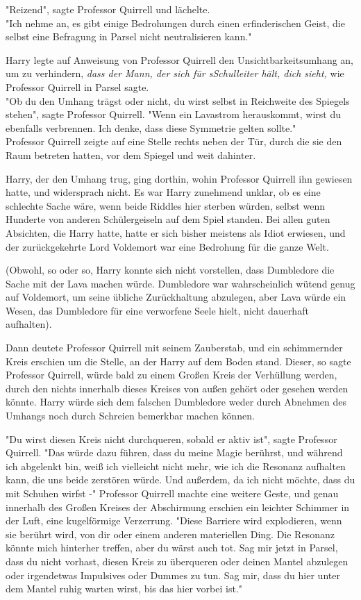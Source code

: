 {"Reizend", sagte Professor Quirrell und lächelte.\\ "Ich nehme an, es gibt einige Bedrohungen durch einen erfinderischen Geist, die selbst eine Befragung in Parsel nicht neutralisieren kann."

Harry legte auf Anweisung von Professor Quirrell den Unsichtbarkeitsumhang an, um zu verhindern, \emph{dass der Mann, der sich für sSchulleiter hält, dich sieht,} wie Professor Quirrell in Parsel sagte.\\ "Ob du den Umhang trägst oder nicht, du wirst selbst in Reichweite des Spiegels stehen", sagte Professor Quirrell. "Wenn ein Lavastrom herauskommt, wirst du ebenfalls verbrennen. Ich denke, dass diese Symmetrie gelten sollte."\\ Professor Quirrell zeigte auf eine Stelle rechts neben der Tür, durch die sie den Raum betreten hatten, vor dem Spiegel und weit dahinter.

Harry, der den Umhang trug, ging dorthin, wohin Professor Quirrell ihn gewiesen hatte, und widersprach nicht. Es war Harry zunehmend unklar, ob es eine schlechte Sache wäre, wenn beide Riddles hier sterben würden, selbst wenn Hunderte von anderen Schülergeiseln auf dem Spiel standen. Bei allen guten Absichten, die Harry hatte, hatte er sich bisher meistens als Idiot erwiesen, und der zurückgekehrte Lord Voldemort war eine Bedrohung für die ganze Welt.

(Obwohl, so oder so, Harry konnte sich nicht vorstellen, dass Dumbledore die Sache mit der Lava machen würde. Dumbledore war wahrscheinlich wütend genug auf Voldemort, um seine übliche Zurückhaltung abzulegen, aber Lava würde ein Wesen, das Dumbledore für eine verworfene Seele hielt, nicht dauerhaft aufhalten).

Dann deutete Professor Quirrell mit seinem Zauberstab, und ein schimmernder Kreis erschien um die Stelle, an der Harry auf dem Boden stand. Dieser, so sagte Professor Quirrell, würde bald zu einem Großen Kreis der Verhüllung werden, durch den nichts innerhalb dieses Kreises von außen gehört oder gesehen werden könnte. Harry würde sich dem falschen Dumbledore weder durch Abnehmen des Umhangs noch durch Schreien bemerkbar machen können.

"Du wirst diesen Kreis nicht durchqueren, sobald er aktiv ist", sagte Professor Quirrell. "Das würde dazu führen, dass du meine Magie berührst, und während ich abgelenkt bin, weiß ich vielleicht nicht mehr, wie ich die Resonanz aufhalten kann, die uns beide zerstören würde. Und außerdem, da ich nicht möchte, dass du mit Schuhen wirfst -" Professor Quirrell machte eine weitere Geste, und genau innerhalb des Großen Kreises der Abschirmung erschien ein leichter Schimmer in der Luft, eine kugelförmige Verzerrung. "Diese Barriere wird explodieren, wenn sie berührt wird, von dir oder einem anderen materiellen Ding. Die Resonanz könnte mich hinterher treffen, aber du wärst auch tot. Sag mir jetzt in Parsel, dass du nicht vorhast, diesen Kreis zu überqueren oder deinen Mantel abzulegen oder irgendetwas Impulsives oder Dummes zu tun. Sag mir, dass du hier unter dem Mantel ruhig warten wirst, bis das hier vorbei ist."

}
